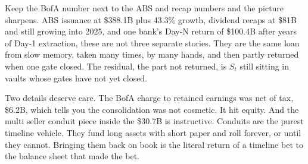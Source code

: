 Keep the BofA number next to the ABS and recap numbers and the picture sharpens. ABS issuance at \$388.1B plus 43.3\% growth, dividend recaps at \$81B and still growing into 2025, and one bank's Day-N return of \$100.4B after years of Day-1 extraction, these are not three separate stories. They are the same loan from slow memory, taken many times, by many hands, and then partly returned when one gate closed. The residual, the part not returned, is $S_t$ still sitting in vaults whose gates have not yet closed.

Two details deserve care. The BofA charge to retained earnings was net of tax, \$6.2B, which tells you the consolidation was not cosmetic. It hit equity. And the multi seller conduit piece inside the \$30.7B is instructive. Conduits are the purest timeline vehicle. They fund long assets with short paper and roll forever, or until they cannot. Bringing them back on book is the literal return of a timeline bet to the balance sheet that made the bet.

